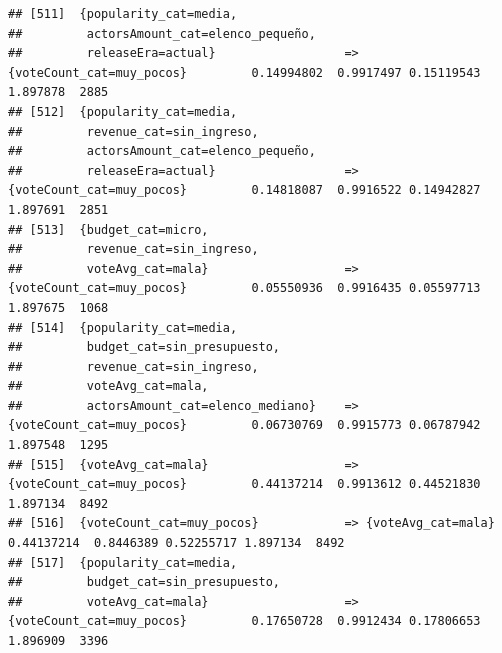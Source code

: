 \documentclass[
]{article}
\begin{document}
\begin{verbatim}
## [511]  {popularity_cat=media,                                                                                                   
##         actorsAmount_cat=elenco_pequeño,                                                                                        
##         releaseEra=actual}                  => {voteCount_cat=muy_pocos}         0.14994802  0.9917497 0.15119543 1.897878  2885
## [512]  {popularity_cat=media,                                                                                                   
##         revenue_cat=sin_ingreso,                                                                                                
##         actorsAmount_cat=elenco_pequeño,                                                                                        
##         releaseEra=actual}                  => {voteCount_cat=muy_pocos}         0.14818087  0.9916522 0.14942827 1.897691  2851
## [513]  {budget_cat=micro,                                                                                                       
##         revenue_cat=sin_ingreso,                                                                                                
##         voteAvg_cat=mala}                   => {voteCount_cat=muy_pocos}         0.05550936  0.9916435 0.05597713 1.897675  1068
## [514]  {popularity_cat=media,                                                                                                   
##         budget_cat=sin_presupuesto,                                                                                             
##         revenue_cat=sin_ingreso,                                                                                                
##         voteAvg_cat=mala,                                                                                                       
##         actorsAmount_cat=elenco_mediano}    => {voteCount_cat=muy_pocos}         0.06730769  0.9915773 0.06787942 1.897548  1295
## [515]  {voteAvg_cat=mala}                   => {voteCount_cat=muy_pocos}         0.44137214  0.9913612 0.44521830 1.897134  8492
## [516]  {voteCount_cat=muy_pocos}            => {voteAvg_cat=mala}                0.44137214  0.8446389 0.52255717 1.897134  8492
## [517]  {popularity_cat=media,                                                                                                   
##         budget_cat=sin_presupuesto,                                                                                             
##         voteAvg_cat=mala}                   => {voteCount_cat=muy_pocos}         0.17650728  0.9912434 0.17806653 1.896909  3396

\end{verbatim}
\end{document}
